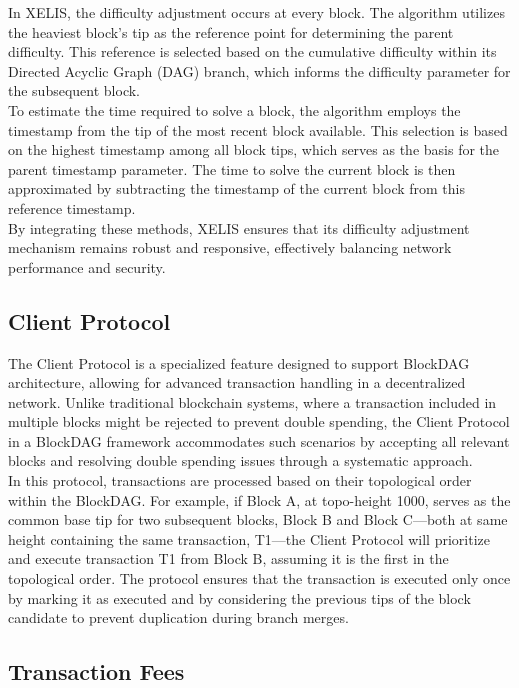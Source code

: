 \documentclass[12pt,a4paper,twocolumn]{article}
\begin{document}
In XELIS, the difficulty adjustment occurs at every block. The algorithm utilizes the heaviest block’s tip as the reference point for determining the parent difficulty. This reference is selected based on the cumulative difficulty within its Directed Acyclic Graph (DAG) branch, which informs the difficulty parameter for the subsequent block.\\

To estimate the time required to solve a block, the algorithm employs the timestamp from the tip of the most recent block available. This selection is based on the highest timestamp among all block tips, which serves as the basis for the parent timestamp parameter. The time to solve the current block is then approximated by subtracting the timestamp of the current block from this reference timestamp.\\

By integrating these methods, XELIS ensures that its difficulty adjustment mechanism remains robust and responsive, effectively balancing network performance and security.

\subsection{Client Protocol}

The Client Protocol is a specialized feature designed to support BlockDAG architecture, allowing for advanced transaction handling in a decentralized network. Unlike traditional blockchain systems, where a transaction included in multiple blocks might be rejected to prevent double spending, the Client Protocol in a BlockDAG framework accommodates such scenarios by accepting all relevant blocks and resolving double spending issues through a systematic approach.\\

In this protocol, transactions are processed based on their topological order within the BlockDAG. For example, if Block A, at topo-height 1000, serves as the common base tip for two subsequent blocks, Block B and Block C—both at same height containing the same transaction, T1—the Client Protocol will prioritize and execute transaction T1 from Block B, assuming it is the first in the topological order. The protocol ensures that the transaction is executed only once by marking it as executed and by considering the previous tips of the block candidate to prevent duplication during branch merges.\\

\subsection{Transaction Fees}
\end{document}
